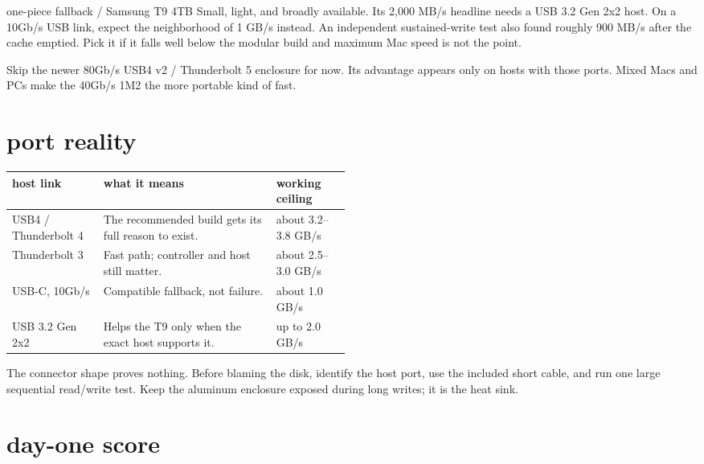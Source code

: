 \documentclass[10pt,letterpaper]{article}
\begin{document}
\begin{gearcard}{one-piece fallback / Samsung T9 4TB}
Small, light, and broadly available. Its 2,000 MB/s headline needs a USB 3.2
Gen 2x2 host. On a 10Gb/s USB link, expect the neighborhood of 1 GB/s instead.
An independent sustained-write test also found roughly 900 MB/s after the
cache emptied. Pick it if it falls well below the modular build and maximum
Mac speed is not the point.
\end{gearcard}

\begin{gearwarning}
Skip the newer 80Gb/s USB4 v2 / Thunderbolt 5 enclosure for now. Its advantage
appears only on hosts with those ports. Mixed Macs and PCs make the 40Gb/s 1M2
the more portable kind of fast.
\end{gearwarning}

\section{port reality}

\begin{tabularx}{\linewidth}{@{}p{0.27\linewidth}Y p{0.22\linewidth}@{}}
\toprule
\textbf{host link} & \textbf{what it means} & \textbf{working ceiling} \\
\midrule
USB4 / Thunderbolt 4 & The recommended build gets its full reason to exist. & about 3.2--3.8 GB/s \\
Thunderbolt 3 & Fast path; controller and host still matter. & about 2.5--3.0 GB/s \\
USB-C, 10Gb/s & Compatible fallback, not failure. & about 1.0 GB/s \\
USB 3.2 Gen 2x2 & Helps the T9 only when the exact host supports it. & up to 2.0 GB/s \\
\bottomrule
\end{tabularx}

The connector shape proves nothing. Before blaming the disk, identify the host
port, use the included short cable, and run one large sequential read/write
test. Keep the aluminum enclosure exposed during long writes; it is the heat
sink.

\section{day-one score}
\end{document}
